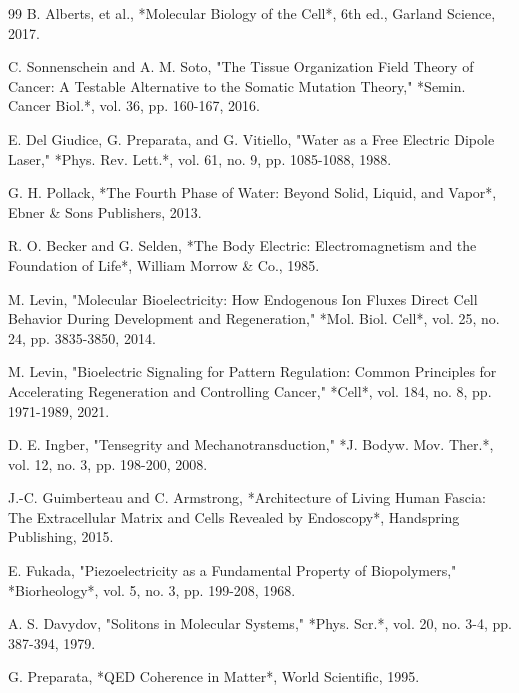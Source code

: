 \documentclass[10pt,twocolumn]{article}
\begin{document}
\begin{thebibliography}{99}
  B. Alberts, et al., *Molecular Biology of the Cell*, 6th ed., Garland Science, 2017.

  C. Sonnenschein and A. M. Soto, "The Tissue Organization Field Theory of Cancer: A Testable Alternative to the Somatic Mutation Theory," *Semin. Cancer Biol.*, vol. 36, pp. 160-167, 2016.

  E. Del Giudice, G. Preparata, and G. Vitiello, "Water as a Free Electric Dipole Laser," *Phys. Rev. Lett.*, vol. 61, no. 9, pp. 1085-1088, 1988.

  G. H. Pollack, *The Fourth Phase of Water: Beyond Solid, Liquid, and Vapor*, Ebner & Sons Publishers, 2013.

  R. O. Becker and G. Selden, *The Body Electric: Electromagnetism and the Foundation of Life*, William Morrow & Co., 1985.

  M. Levin, "Molecular Bioelectricity: How Endogenous Ion Fluxes Direct Cell Behavior During Development and Regeneration," *Mol. Biol. Cell*, vol. 25, no. 24, pp. 3835-3850, 2014.

  M. Levin, "Bioelectric Signaling for Pattern Regulation: Common Principles for Accelerating Regeneration and Controlling Cancer," *Cell*, vol. 184, no. 8, pp. 1971-1989, 2021.

  D. E. Ingber, "Tensegrity and Mechanotransduction," *J. Bodyw. Mov. Ther.*, vol. 12, no. 3, pp. 198-200, 2008.

  J.-C. Guimberteau and C. Armstrong, *Architecture of Living Human Fascia: The Extracellular Matrix and Cells Revealed by Endoscopy*, Handspring Publishing, 2015.

  E. Fukada, "Piezoelectricity as a Fundamental Property of Biopolymers," *Biorheology*, vol. 5, no. 3, pp. 199-208, 1968.

  A. S. Davydov, "Solitons in Molecular Systems," *Phys. Scr.*, vol. 20, no. 3-4, pp. 387-394, 1979.

  G. Preparata, *QED Coherence in Matter*, World Scientific, 1995.


\end{thebibliography}
\end{document}
